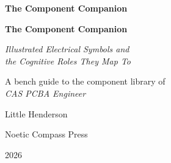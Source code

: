 
\frontmatter
\pagestyle{plainbook}

\thispagestyle{empty}
\begin{center}
  \vspace*{2.5in}
  {\huge\bfseries The Component Companion\par}
\end{center}
\cleardoublepage

\thispagestyle{empty}
\begin{center}
  \vspace*{1.0in}
  {\Huge\bfseries The Component Companion\par}
  \vspace{0.5in}
  {\Large\itshape Illustrated Electrical Symbols and\\[0.10in]
   the Cognitive Roles They Map To\par}
  \vspace{0.45in}
  {\large A bench guide to the component library of\\[0.08in]
   \itshape CAS PCBA Engineer\par}
  \vspace{1.2in}
  {\Large Little Henderson\par}
  \vfill
  {\normalsize Noetic Compass Press\par}
  {\small 2026\par}
\end{center}
\clearpage

